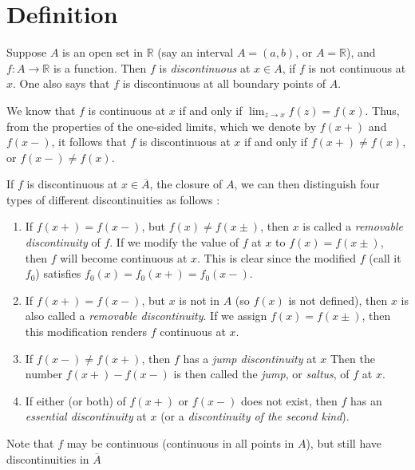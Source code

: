 \documentclass[12pt]{article}
\newcommand{\sR}[0]{\mathbb{R}}
\begin{document}
\section*{Definition}
 Suppose $A$ is an open set in $\sR$ (say an interval $A=(a,b)$, or $A=\sR$), 
 and $f:A\to \sR$ is a function.
 Then $f$ is \emph{discontinuous} at $x\in A$, if $f$ is not continuous
 at $x$. One also says that $f$ is discontinuous at all boundary points of $A$.

We know that $f$ is continuous at $x$ if and only 
if $\lim_{z\to x} f(z)=f(x)$. Thus, from the properties of the 
one-sided limits, which we denote by $f(x+)$ and $f(x-)$, it follows
 that $f$ is discontinuous at $x$ if and only if 
$f(x+)\neq f(x)$, or $f(x-)\neq f(x)$.

If $f$ is discontinuous at $x\in\overline{A}$, the closure of $A$, we can then distinguish four types of
different discontinuities as follows  \cite{hoskins, contline}:
\begin{enumerate}
\item If $f(x+)=f(x-)$, but $f(x)\neq f(x\pm)$,
then $x$ is called a \emph{removable discontinuity} of $f$. 
If we modify the value of $f$ at $x$ to $f(x)=f(x\pm)$, 
then $f$ will become continuous at $x$. 
This is clear since the modified $f$ (call it $f_0$) satisfies 
$f_0(x) = f_0(x+)=f_0(x-).$
\item If $f(x+)=f(x-)$, but $x$ is not in $A$ (so $f(x)$ is 
not defined), then $x$ is also called a \emph{removable discontinuity}. 
If we assign $f(x)=f(x\pm)$, then this modification renders $f$
continuous at $x$. 
\item If $f(x-)\neq f(x+)$, then $f$ has a \emph{jump discontinuity} at $x$
Then the number $f(x+)-f(x-)$ is then called the \emph{jump},
or \emph{saltus}, of $f$ at $x$.  
\item If either (or both) of $f(x+)$ or $f(x-)$ does not exist, then 
$f$ has an \emph{essential discontinuity} at $x$
(or a \emph{discontinuity of the second kind}).
\end{enumerate}
Note that $f$ may be continuous (continuous in all points in $A$), but still have discontinuities in $\overline{A}$
 
\end{document}
